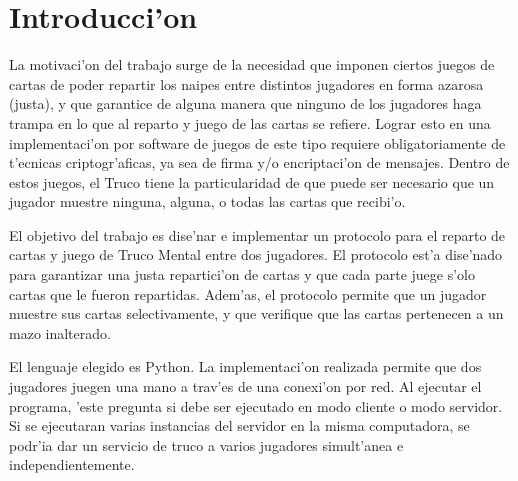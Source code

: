 \section{Introducci'on}
La motivaci'on del trabajo surge de la necesidad que imponen ciertos juegos de cartas de poder repartir los naipes entre distintos jugadores en forma azarosa (justa), y que garantice de alguna manera que ninguno de los jugadores haga trampa en lo que al reparto y juego de las cartas se refiere. Lograr esto en una implementaci'on por software de juegos de este tipo requiere obligatoriamente de t'ecnicas criptogr'aficas, ya sea de firma y/o encriptaci'on de mensajes. Dentro de estos juegos, el Truco tiene la particularidad de que puede ser necesario que un jugador muestre ninguna, alguna, o todas las cartas que recibi'o.

El objetivo del trabajo es dise'nar e implementar un protocolo para el reparto de cartas y juego de Truco Mental entre dos jugadores.
El protocolo est'a dise'nado para garantizar una justa repartici'on de cartas y que cada parte juege s'olo cartas que le fueron repartidas. Adem'as, el protocolo permite que un jugador muestre sus cartas selectivamente, y que verifique que las cartas pertenecen a un mazo inalterado.

El lenguaje elegido es Python. La implementaci'on realizada permite que dos jugadores juegen una mano a trav'es de una conexi'on por red. Al ejecutar el programa, 'este pregunta si debe ser ejecutado en modo cliente o modo servidor. Si se ejecutaran varias instancias del servidor en la misma computadora, se podr'ia dar un servicio de truco a varios jugadores simult'anea e independientemente.
